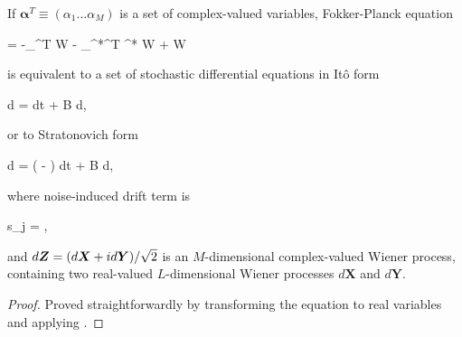 \begin{theorem}
\label{thm:app-fpe:fpe-sde-complex}
    If $\boldsymbol{\alpha}^T \equiv (\alpha_1 \ldots \alpha_M)$ is a set of complex-valued variables,
    Fokker-Planck equation
    \begin{eqn*}
    	= -\boldsymbol{\partial}_{\boldsymbol{\alpha}}^T  W - \boldsymbol{\partial}_{\boldsymbol{\alpha}^*}^T ^* W
    	+  W
    \end{eqn*}
    is equivalent to a set of stochastic differential equations in It\^{o} form
    \begin{eqn*}
    	d\boldsymbol{\alpha} =  dt + B d\Zvec,
    \end{eqn*}
    or to Stratonovich form
    \begin{eqn*}
    	d\boldsymbol{\alpha} = ( - ) dt + B d\Zvec,
    \end{eqn*}
    where noise-induced drift term is
    \begin{eqn*}
    	s_j = ,
    \end{eqn*}
    and $d\boldsymbol{Z} = (d\boldsymbol{X} + id\boldsymbol{Y}) / \sqrt{2}$ is an $M$-dimensional complex-valued Wiener process,
    containing two real-valued $L$-dimensional Wiener processes $d\boldsymbol{X}$ and $d\boldsymbol{Y}$.
\end{theorem}
\begin{proof}
Proved straightforwardly by transforming the equation to real variables and applying .
\end{proof}

